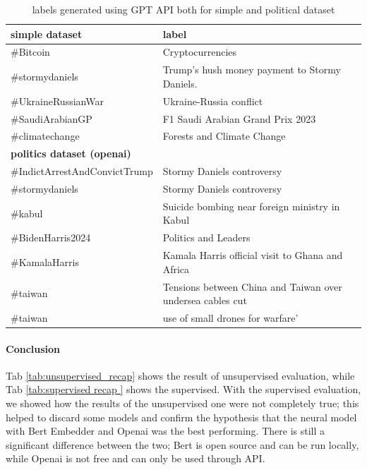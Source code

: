 \begin{table}[H]
\begin{tabular}{ll}
\hline
\textbf{simple dataset}            & \textbf{label}                                             \\ \hline
\#Bitcoin                          & Cryptocurrencies                                            \\
\#stormydaniels                    & Trump's hush money payment to Stormy Daniels.              \\
\#UkraineRussianWar                & Ukraine-Russia conflict                                    \\
\#SaudiArabianGP                   & F1 Saudi Arabian Grand Prix 2023                           \\
\#climatechange                    & Forests and Climate Change                                 \\ \hline
\textbf{politics dataset (openai)} &                                                            \\ \hline
\#IndictArrestAndConvictTrump      & Stormy Daniels controversy                                 \\
\#stormydaniels                    & Stormy Daniels controversy                                 \\
\#kabul                            & Suicide bombing near foreign ministry in Kabul             \\
\#BidenHarris2024                  & Politics and Leaders                                       \\
\#KamalaHarris                     & Kamala Harris official visit to Ghana and Africa           \\
\#taiwan                           & Tensions between China and Taiwan over undersea cables cut \\
\#taiwan                           & use of small drones for warfare'                           \\ \hline
\end{tabular}
\caption{labels generated using GPT API both for simple and political dataset
}
\label{tab:supervised_labels}
\end{table}

\paragraph{Conclusion}
Tab \ref{tab:unsupervised_recap} shows the result of unsupervised evaluation, while Tab \ref{tab:supervised recap } shows the supervised. With the supervised evaluation, we showed how the results of the unsupervised one were not completely true; this helped to discard some models and confirm the hypothesis that the neural model with Bert Embedder and Openai was the best performing. There is still a significant difference between the two; Bert is open source and can be run locally, while Openai is not free and can only be used through API.



